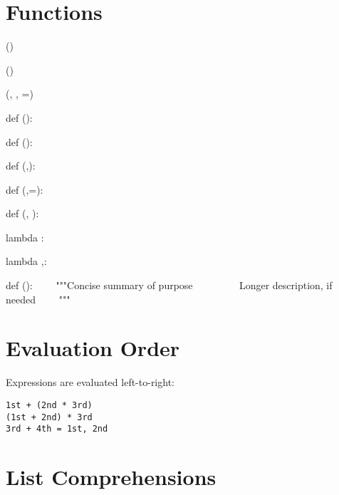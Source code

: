 \documentclass{refcard}
\begin{document}
\section{Functions}

\begin{ldesc}
	\li[referencing]  \li

	\li[calling]     () \li

	 () \li

	 (, , =) \li

	\li[0-arguments] def (): \li
	                 ~~~~ \li

	\li[1-argument]  def (): \li
	                 ~~~~ \li

	\li[2-arguments] def (,): \li
	                 ~~~~ \li

	 def (,=): \li
	                       ~~~~ \li

	 def (, ): \li
	                         ~~~~ \li

	      lambda :~ \li

	     lambda ,:~ \li

	\li[docstring] def (): \li
	               ~~~~"""Concise summary of purpose \li
	               ~~~~ \li
	               ~~~~Longer description, if needed \li
	               ~~~~""" \li
	               ~~~~ \li
\end{ldesc}

\section{Evaluation Order}

Expressions are evaluated left-to-right:
\begin{verbatim}
1st + (2nd * 3rd)
(1st + 2nd) * 3rd
3rd + 4th = 1st, 2nd
\end{verbatim}

\section{List Comprehensions}
\end{document}
